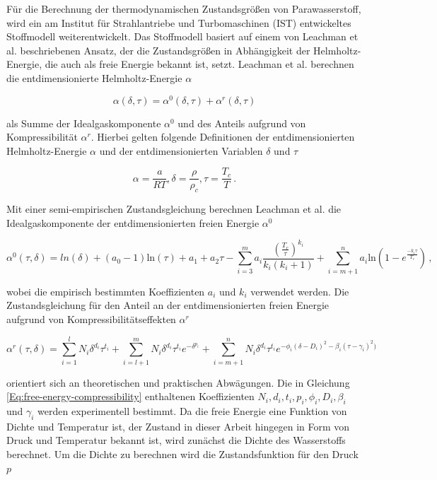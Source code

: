 Für die Berechnung der thermodynamischen Zustandsgrößen von Parawasserstoff, wird ein am Institut für Strahlantriebe und Turbomaschinen (IST) entwickeltes Stoffmodell weiterentwickelt. Das Stoffmodell basiert auf einem von Leachman et al. \cite{Leachman.2017} beschriebenen Ansatz, der die Zustandsgrößen in Abhängigkeit der Helmholtz-Energie, die auch als freie Energie bekannt ist, setzt. Leachman et al. berechnen die entdimensionierte Helmholtz-Energie $\alpha$ 

\begin{equation}\label{Eq:free-energy}
	\alpha(\delta, \tau) = \alpha^0(\delta, \tau) + \alpha^r(\delta, \tau)
\end{equation}

als Summe der Idealgaskomponente $\alpha^0$ und des Anteils aufgrund von Kompressibilität $\alpha^r$. Hierbei gelten folgende Definitionen der entdimensionierten Helmholtz-Energie $\alpha$ und der entdimensionierten Variablen $\delta$ und $\tau$

\begin{equation}
	\alpha = \frac{a}{RT}, \delta = \frac{\rho}{\rho_c}, \tau = \frac{T_c}{T} \,.
\end{equation}

Mit einer semi-empirischen Zustandsgleichung berechnen Leachman et al. die Idealgaskomponente der entdimensionierten freien Energie $\alpha^0$

\begin{equation}\label{Eq:free-energy-idealgas}
	\alpha^0(\tau,\delta)=ln(\delta)+(a_0-1)\mathrm{ln}(\tau)+a_1+a_2\tau-\sum_{i=3}^{m}a_i\frac{(\frac{T_c}{\tau})^{k_i}}{k_i(k_i+1)}+\sum_{i=m+1}^{n}a_i\mathrm{ln}\left(1-e^{\frac{-k_i\tau}{T_c}}\right) \,,
\end{equation}

wobei die empirisch bestimmten Koeffizienten $a_i$ und $k_i$ verwendet werden. Die Zustandsgleichung für den Anteil an der entdimensionierten freien Energie aufgrund von Kompressibilitätseffekten $\alpha^r$

\begin{equation}\label{Eq:free-energy-compressibility}
	\alpha^r(\tau,\delta)=\sum_{i=1}^{l}N_i\delta^{d_i}\tau^{t_i}+\sum_{i=l+1}^{m}N_i\delta^{d_i}\tau^{t_i}e^{-\delta^{p_i}}+\sum_{i=m+1}^{n}N_i\delta^{d_i}\tau^{t_i}e^{-\phi_i(\delta-D_i)^2-\beta_i(\tau-\gamma_i)^2)}
\end{equation}

orientiert sich an theoretischen und praktischen Abwägungen. Die in Gleichung \ref{Eq:free-energy-compressibility} enthaltenen Koeffizienten $N_i, d_i, t_i, p_i, \phi_i, D_i, \beta_i$ und $\gamma_i$ werden experimentell bestimmt. Da die freie Energie eine Funktion von Dichte und Temperatur ist, der Zustand in dieser Arbeit hingegen in Form von Druck und Temperatur bekannt ist, wird zunächst die Dichte des Wasserstoffs berechnet. Um die Dichte zu berechnen wird die Zustandsfunktion für den Druck $p$

